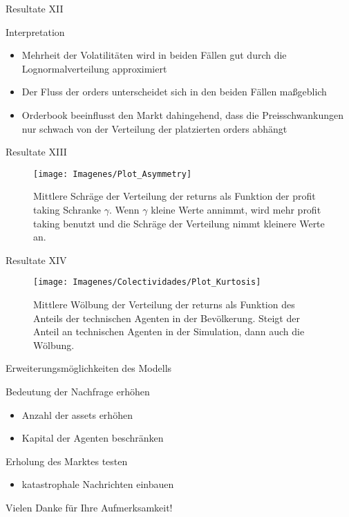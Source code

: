 \documentclass{beamer}
\begin{document}
	\begin{frame}{Resultate XII}
		\begin{block}{Interpretation}
			\begin{itemize}
				\item Mehrheit der Volatilitäten wird in beiden Fällen gut durch die Lognormalverteilung approximiert
				\item Der Fluss der orders unterscheidet sich in den beiden Fällen maßgeblich
				\item Orderbook beeinflusst den Markt dahingehend, dass die Preisschwankungen nur schwach von der Verteilung der platzierten orders abhängt
			\end{itemize}
		\end{block}
	\end{frame}

	\begin{frame}{Resultate XIII}
		\begin{figure}[!h]
			
			\centering
			\texttt{[image: Imagenes/Plot\_Asymmetry]}
			\caption{Mittlere Schräge der Verteilung der returns als Funktion der profit taking Schranke $\gamma$. Wenn $\gamma$ kleine Werte annimmt, wird mehr profit taking benutzt und die Schräge der Verteilung nimmt kleinere Werte an.}
		\end{figure}
	\end{frame}

	\begin{frame}{Resultate XIV}
		\begin{figure}[!h]
			\centering
			\texttt{[image: Imagenes/Colectividades/Plot\_Kurtosis]}
			\caption{Mittlere Wölbung der Verteilung der returns als Funktion des Anteils der technischen Agenten in der Bevölkerung. Steigt der Anteil an technischen Agenten in der Simulation, dann auch die Wölbung.}
		\end{figure}
	\end{frame}

	\begin{frame}{Erweiterungsmöglichkeiten des Modells}
		\begin{block}{Bedeutung der Nachfrage erhöhen}
			\begin{itemize}
			\item Anzahl der assets erhöhen
			\item Kapital der Agenten beschränken
			\end{itemize}
		\end{block}
		\begin{block}{Erholung des Marktes testen}
			\begin{itemize}
				\item katastrophale Nachrichten einbauen
			\end{itemize}
		\end{block}
	\end{frame}

	\begin{frame}
		Vielen Danke für Ihre Aufmerksamkeit!
	\end{frame}
\end{document}
